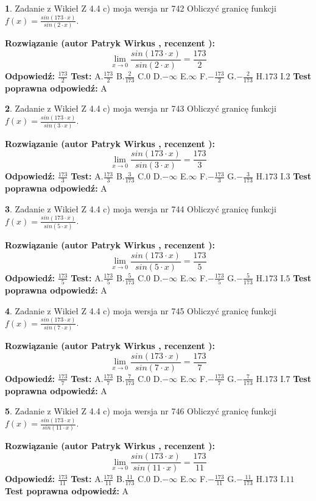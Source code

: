 \documentclass[12pt, a4paper]{article}
\theoremstyle{definition} %
\newtheorem{zad}{}
\newcommand{\zadStart}[1]{\begin{zad}#1\newline}
\newcommand{\zadStop}{\end{zad}}
\newcommand{\rozwStart}[2]{\noindent \textbf{Rozwiązanie (autor #1 , recenzent #2): }\newline}
\newcommand{\rozwStop}{\newline}
\newcommand{\odpStart}{\noindent \textbf{Odpowiedź:}\newline}
\newcommand{\odpStop}{\newline}
\newcommand{\testStart}{\noindent \textbf{Test:}\newline}
\newcommand{\testStop}{\newline}
\newcommand{\kluczStart}{\noindent \textbf{Test poprawna odpowiedź:}\newline}
\newcommand{\kluczStop}{\newline}
\begin{document}
\zadStart{Zadanie z Wikieł Z 4.4 c) moja wersja nr 742}
Obliczyć granicę funkcji $f(x)=\frac{sin(173\cdot x)}{sin(2\cdot x)}$.
\zadStop
\rozwStart{Patryk Wirkus}{}
$$\lim\limits_{x\to 0}\frac{sin(173\cdot x)}{sin(2\cdot x)}=
\frac{173}{2}$$
\rozwStop
\odpStart
$\frac{173}{2}$
\odpStop
\testStart
A.$\frac{173}{2}$
B.$\frac{2}{173}$
C.$0$
D.$-\infty$
E.$\infty$
F.$-\frac{173}{2}$
G.$-\frac{2}{173}$
H.$173$
I.$2$
\testStop
\kluczStart
A
\kluczStop



\zadStart{Zadanie z Wikieł Z 4.4 c) moja wersja nr 743}
Obliczyć granicę funkcji $f(x)=\frac{sin(173\cdot x)}{sin(3\cdot x)}$.
\zadStop
\rozwStart{Patryk Wirkus}{}
$$\lim\limits_{x\to 0}\frac{sin(173\cdot x)}{sin(3\cdot x)}=
\frac{173}{3}$$
\rozwStop
\odpStart
$\frac{173}{3}$
\odpStop
\testStart
A.$\frac{173}{3}$
B.$\frac{3}{173}$
C.$0$
D.$-\infty$
E.$\infty$
F.$-\frac{173}{3}$
G.$-\frac{3}{173}$
H.$173$
I.$3$
\testStop
\kluczStart
A
\kluczStop



\zadStart{Zadanie z Wikieł Z 4.4 c) moja wersja nr 744}
Obliczyć granicę funkcji $f(x)=\frac{sin(173\cdot x)}{sin(5\cdot x)}$.
\zadStop
\rozwStart{Patryk Wirkus}{}
$$\lim\limits_{x\to 0}\frac{sin(173\cdot x)}{sin(5\cdot x)}=
\frac{173}{5}$$
\rozwStop
\odpStart
$\frac{173}{5}$
\odpStop
\testStart
A.$\frac{173}{5}$
B.$\frac{5}{173}$
C.$0$
D.$-\infty$
E.$\infty$
F.$-\frac{173}{5}$
G.$-\frac{5}{173}$
H.$173$
I.$5$
\testStop
\kluczStart
A
\kluczStop



\zadStart{Zadanie z Wikieł Z 4.4 c) moja wersja nr 745}
Obliczyć granicę funkcji $f(x)=\frac{sin(173\cdot x)}{sin(7\cdot x)}$.
\zadStop
\rozwStart{Patryk Wirkus}{}
$$\lim\limits_{x\to 0}\frac{sin(173\cdot x)}{sin(7\cdot x)}=
\frac{173}{7}$$
\rozwStop
\odpStart
$\frac{173}{7}$
\odpStop
\testStart
A.$\frac{173}{7}$
B.$\frac{7}{173}$
C.$0$
D.$-\infty$
E.$\infty$
F.$-\frac{173}{7}$
G.$-\frac{7}{173}$
H.$173$
I.$7$
\testStop
\kluczStart
A
\kluczStop



\zadStart{Zadanie z Wikieł Z 4.4 c) moja wersja nr 746}
Obliczyć granicę funkcji $f(x)=\frac{sin(173\cdot x)}{sin(11\cdot x)}$.
\zadStop
\rozwStart{Patryk Wirkus}{}
$$\lim\limits_{x\to 0}\frac{sin(173\cdot x)}{sin(11\cdot x)}=
\frac{173}{11}$$
\rozwStop
\odpStart
$\frac{173}{11}$
\odpStop
\testStart
A.$\frac{173}{11}$
B.$\frac{11}{173}$
C.$0$
D.$-\infty$
E.$\infty$
F.$-\frac{173}{11}$
G.$-\frac{11}{173}$
H.$173$
I.$11$
\testStop
\kluczStart
A
\kluczStop
\end{document}
